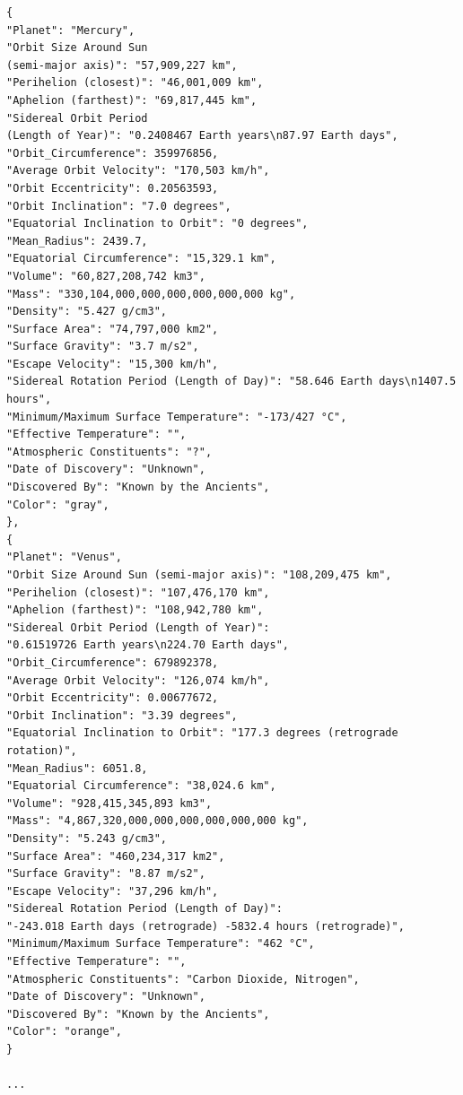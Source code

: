 \documentclass[journal]{vgtc}                %
\begin{document}
\begin{lstlisting}[frame=single, basicstyle=\tiny]
{
"Planet": "Mercury",
"Orbit Size Around Sun 
(semi-major axis)": "57,909,227 km",
"Perihelion (closest)": "46,001,009 km",
"Aphelion (farthest)": "69,817,445 km",
"Sidereal Orbit Period 
(Length of Year)": "0.2408467 Earth years\n87.97 Earth days",
"Orbit_Circumference": 359976856,
"Average Orbit Velocity": "170,503 km/h",
"Orbit Eccentricity": 0.20563593,
"Orbit Inclination": "7.0 degrees",
"Equatorial Inclination to Orbit": "0 degrees",
"Mean_Radius": 2439.7,
"Equatorial Circumference": "15,329.1 km",
"Volume": "60,827,208,742 km3",
"Mass": "330,104,000,000,000,000,000,000 kg",
"Density": "5.427 g/cm3",
"Surface Area": "74,797,000 km2",
"Surface Gravity": "3.7 m/s2",
"Escape Velocity": "15,300 km/h",
"Sidereal Rotation Period (Length of Day)": "58.646 Earth days\n1407.5 hours",
"Minimum/Maximum Surface Temperature": "-173/427 °C",
"Effective Temperature": "",
"Atmospheric Constituents": "?",
"Date of Discovery": "Unknown",
"Discovered By": "Known by the Ancients",
"Color": "gray",
},
{
"Planet": "Venus",
"Orbit Size Around Sun (semi-major axis)": "108,209,475 km",
"Perihelion (closest)": "107,476,170 km",
"Aphelion (farthest)": "108,942,780 km",
"Sidereal Orbit Period (Length of Year)": 
"0.61519726 Earth years\n224.70 Earth days",
"Orbit_Circumference": 679892378,
"Average Orbit Velocity": "126,074 km/h",
"Orbit Eccentricity": 0.00677672,
"Orbit Inclination": "3.39 degrees",
"Equatorial Inclination to Orbit": "177.3 degrees (retrograde rotation)",
"Mean_Radius": 6051.8,
"Equatorial Circumference": "38,024.6 km",
"Volume": "928,415,345,893 km3",
"Mass": "4,867,320,000,000,000,000,000,000 kg",
"Density": "5.243 g/cm3",
"Surface Area": "460,234,317 km2",
"Surface Gravity": "8.87 m/s2",
"Escape Velocity": "37,296 km/h",
"Sidereal Rotation Period (Length of Day)":
"-243.018 Earth days (retrograde) -5832.4 hours (retrograde)",
"Minimum/Maximum Surface Temperature": "462 °C",
"Effective Temperature": "",
"Atmospheric Constituents": "Carbon Dioxide, Nitrogen",
"Date of Discovery": "Unknown",
"Discovered By": "Known by the Ancients",
"Color": "orange",
}

...
\end{lstlisting}

\end{document}
